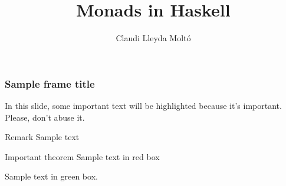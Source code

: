\documentclass[notes]{beamer}
\title{Monads in Haskell}
\author{Claudi Lleyda Moltó}
\institute[UAB]{Universitat Autònoma de Barcelona}
\date{}
\begin{document}
\begin{frame}
    \titlepage
\end{frame}


\begin{frame}
    \frametitle{Sample frame title}

    In this slide, some important text will be
    \alert{highlighted} because it's important.
    Please, don't abuse it.

    \begin{block}{Remark}
        Sample text
    \end{block}

    \begin{alertblock}{Important theorem}
        Sample text in red box
    \end{alertblock}

    \begin{examples}
        Sample text in green box.
    \end{examples}
\end{frame}
\end{document}
